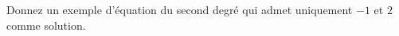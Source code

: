 %
%
    Donnez un exemple d'équation du second degré qui admet uniquement \(-1\) et \(2\) comme solution.
